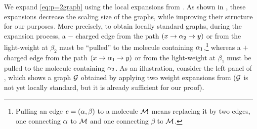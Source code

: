 \begin{example}
\begin{center}
{}
\end{center}
We expand \eqref{eq:p=2graph} using the local expansions from . As shown in , these expansions decrease the scaling size of the graphs, while improving their structure for our purposes. 
More precisely, to obtain locally standard graphs, during the expansion process, a $-$ charged edge from the path $(x\to \al_2\to y)$ or from the light-weight at $\beta_2$ must be ``pulled'' to the molecule containing $\al_1$,\footnote{Pulling an edge $e=(\al,\beta)$ to a molecule $\Mol$ means replacing it by two edges, one connecting $\al$ to $\Mol$ and one connecting $\beta$ to $\Mol$.} whereas a $+$ charged edge from the path $(x\to \al_1\to y)$ or from the light-weight at $\beta_1$ must be pulled to the molecule containing $\al_2$. 
As an illustration, consider the left panel of , which shows a graph $\cal G$ obtained by applying two weight expansions from  ($\cal G$ is not yet locally standard, but it is already sufficient for our proof). 

\end{example}
